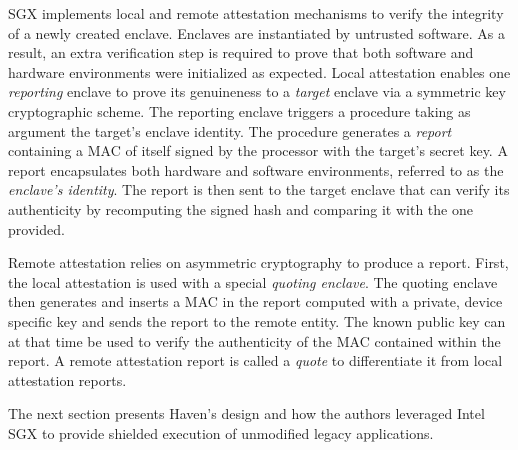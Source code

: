 SGX implements local and remote attestation mechanisms to verify the integrity of a newly created enclave.
Enclaves are instantiated by untrusted software.
As a result, an extra verification step is required to prove that both software and hardware environments were initialized as expected.
Local attestation enables one \emph{reporting} enclave to prove its genuineness to a \emph{target} enclave via a symmetric key cryptographic scheme.
The reporting enclave triggers a procedure taking as argument the target's enclave identity.
The procedure generates a \emph{report} containing a MAC of itself signed by the processor with the target's secret key.
A report encapsulates both hardware and software environments, referred to as the \emph{enclave's identity}.
The report is then sent to the target enclave that can verify its authenticity by recomputing the signed hash and comparing it with the one provided.

Remote attestation relies on asymmetric cryptography to produce a report.
First, the local attestation is used with a special \emph{quoting enclave}.
The quoting enclave then generates and inserts a MAC in the report computed with a private, device specific key and sends the report to the remote entity.
The known public key can at that time be used to verify the authenticity of the MAC contained within the report.
A remote attestation report is called a \emph{quote} to differentiate it from local attestation reports.

The next section presents Haven's design and how the authors leveraged Intel SGX to provide shielded execution of unmodified legacy applications.